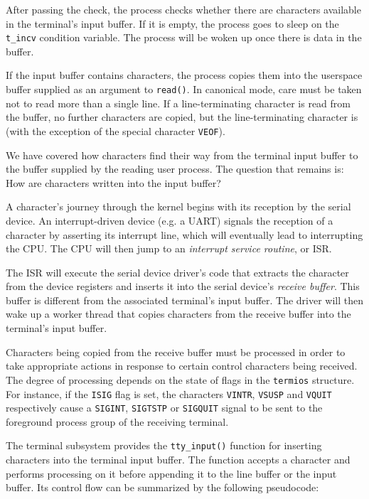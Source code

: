 \documentclass[shortabstract, manyadvisors, english, mgr]{iithesis}
\begin{document}
After passing the check, the process checks whether there are characters
available in the terminal's input buffer. If it is empty, the process goes to
sleep on the \texttt{t\_incv} condition variable. The process will be woken up
once there is data in the buffer.

If the input buffer contains characters, the process copies them into the
userspace buffer supplied as an argument to \texttt{read()}. In canonical mode,
care must be taken not to read more than a single line. If a line-terminating
character is read from the buffer, no further characters are copied, but the
line-terminating character is (with the exception of the special character
\texttt{VEOF}).

We have covered how characters find their way from the terminal input buffer to
the buffer supplied by the reading user process. The question that remains is:
How are characters written into the input buffer?

A character's journey through the kernel begins with its reception by the
serial device. An interrupt-driven device (e.g. a UART) signals the reception of
a character by asserting its interrupt line, which will eventually lead to
interrupting the CPU. The CPU will then jump to an \textit{interrupt service
  routine}, or ISR.

The ISR will execute the serial device driver's code that extracts the character
from the device registers and inserts it into the serial device's
\textit{receive buffer}. This buffer is different from the associated terminal's
input buffer. The driver will then wake up a worker thread that copies
characters from the receive buffer into the terminal's input buffer.

Characters being copied from the receive buffer must be processed in order to
take appropriate actions in response to certain control characters being
received. The degree of processing depends on the state of flags in the
\texttt{termios} structure. For instance, if the \texttt{ISIG} flag is set, the
characters \texttt{VINTR}, \texttt{VSUSP} and \texttt{VQUIT} respectively cause
a \texttt{SIGINT}, \texttt{SIGTSTP} or \texttt{SIGQUIT} signal to be sent to the
foreground process group of the receiving terminal.

The terminal subsystem provides the \texttt{tty\_input()} function for inserting
characters into the terminal input buffer. The function accepts a character and
performs processing on it before appending it to the line buffer or the input
buffer. Its control flow can be summarized by the following pseudocode:
\end{document}
